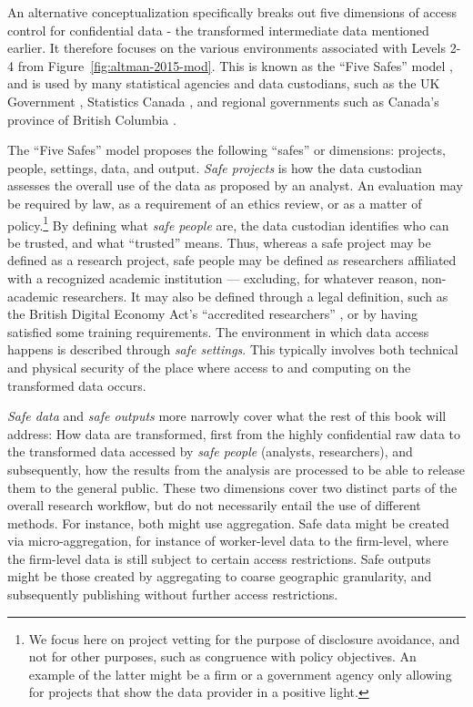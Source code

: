 An alternative conceptualization specifically breaks out five dimensions of access control for confidential data - the transformed intermediate data mentioned earlier. It therefore focuses on the various environments associated with Levels 2-4 from Figure~\ref{fig:altman-2015-mod}. This is known as the ``Five Safes'' model \cite{desai_five_2016}, and is used by many statistical agencies and data custodians, such as the UK Government \cite{uk_government_digital_2020}, Statistics Canada \cite{statistics_canada_information_2018}, and regional governments such as Canada's province of British Columbia \cite{bc_ministry_of_citizens_services_privacy_nodate}.

The ``Five Safes'' model proposes the following ``safes'' or dimensions:  projects,  people,  settings, data, and output. \textit{Safe projects} is how the data custodian assesses the overall use of the data as proposed by an analyst. An evaluation may be required by law, as a requirement of an ethics review, or as a matter of policy.\footnote{We focus here on project vetting for the purpose of disclosure avoidance, and not for other purposes, such as congruence with policy objectives. An example of the latter might be a firm or a government agency only allowing for projects that show the data provider in a positive light.} By defining what \textit{safe people} are, the data custodian identifies who can be trusted, and what ``trusted'' means. Thus, whereas a safe project may be defined as a research project, safe people may be defined as researchers affiliated with a recognized academic institution --- excluding, for whatever reason, non-academic researchers. It may also be defined through a legal definition, such as the British Digital Economy Act's ``accredited researchers'' \cite{uk_government_digital_2020}, or by having satisfied some training requirements. 
The environment in which data access happens is described through \textit{safe settings}. This typically involves both technical and physical security of the place where access to and computing on the transformed data occurs. 

\textit{Safe data} and \textit{safe outputs} more narrowly cover what the rest of this book will address: How data are transformed, first from the highly confidential raw data to the transformed data accessed by \textit{safe people} (analysts, researchers), and subsequently, how the results from the analysis are processed to be able to release them to the general public. These two dimensions cover two distinct parts of the overall research workflow, but do not necessarily entail the use of different methods. For instance, both might use aggregation. Safe data might be created via micro-aggregation, for instance of worker-level data to the firm-level, where the firm-level data is still subject to certain access restrictions. Safe outputs might be those created by aggregating to coarse geographic granularity, and subsequently publishing without further access restrictions. 

